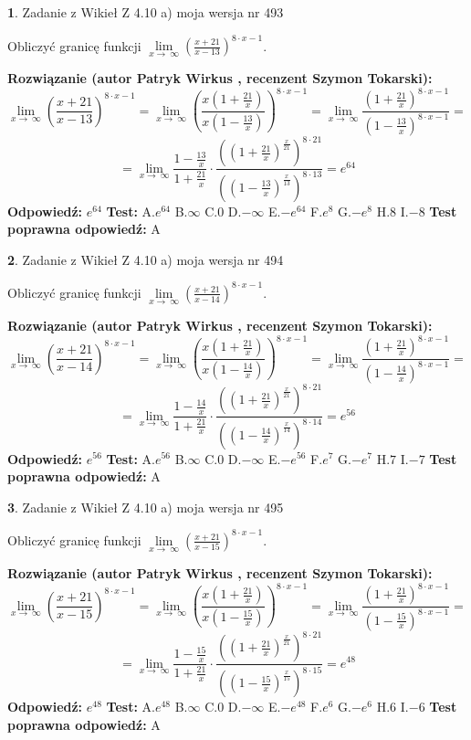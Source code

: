 \documentclass[12pt, a4paper]{article}
\theoremstyle{definition} %
\newtheorem{zad}{}
\newcommand{\zadStart}[1]{\begin{zad}#1\newline}
\newcommand{\zadStop}{\end{zad}}
\newcommand{\rozwStart}[2]{\noindent \textbf{Rozwiązanie (autor #1 , recenzent #2): }\newline}
\newcommand{\rozwStop}{\newline}
\newcommand{\odpStart}{\noindent \textbf{Odpowiedź:}\newline}
\newcommand{\odpStop}{\newline}
\newcommand{\testStart}{\noindent \textbf{Test:}\newline}
\newcommand{\testStop}{\newline}
\newcommand{\kluczStart}{\noindent \textbf{Test poprawna odpowiedź:}\newline}
\newcommand{\kluczStop}{\newline}
\begin{document}
\zadStart{Zadanie z Wikieł Z 4.10 a) moja wersja nr 493}

Obliczyć granicę funkcji  $\lim\limits_{x\to\ \infty}(\frac{x+21}{x-13})^{8\cdot x-1}$.
\zadStop
\rozwStart{Patryk Wirkus}{Szymon Tokarski}
$$\lim\limits_{x\to\ \infty}(\frac{x+21}{x-13})^{8\cdot x-1} = \lim\limits_{x\to\ \infty}(\frac{x(1+\frac{21}{x})}{x(1-\frac{13}{x})})^{8\cdot x-1}=\lim\limits_{x\to\ \infty}\frac{(1+\frac{21}{x})^{8\cdot x-1}}{(1-\frac{13}{x})^{8\cdot x-1}}=$$
$$=\lim\limits_{x\to\ \infty}\frac{1-\frac{13}{x}}{1+\frac{21}{x}}\cdot\frac{((1+\frac{21}{x})^{\frac{x}{21}})^{8\cdot21}}{((1-\frac{13}{x})^{\frac{x}{13}})^{8\cdot13}}=e^{64}$$
\rozwStop
\odpStart
$e^{64}$
\odpStop
\testStart
A.$e^{64}$ B.$\infty$ C.$0$ D.$-\infty$ E.$-e^{64}$
F.$e^{8}$ G.$-e^{8}$
H.$8$
I.$-8$
\testStop
\kluczStart
A
\kluczStop



\zadStart{Zadanie z Wikieł Z 4.10 a) moja wersja nr 494}

Obliczyć granicę funkcji  $\lim\limits_{x\to\ \infty}(\frac{x+21}{x-14})^{8\cdot x-1}$.
\zadStop
\rozwStart{Patryk Wirkus}{Szymon Tokarski}
$$\lim\limits_{x\to\ \infty}(\frac{x+21}{x-14})^{8\cdot x-1} = \lim\limits_{x\to\ \infty}(\frac{x(1+\frac{21}{x})}{x(1-\frac{14}{x})})^{8\cdot x-1}=\lim\limits_{x\to\ \infty}\frac{(1+\frac{21}{x})^{8\cdot x-1}}{(1-\frac{14}{x})^{8\cdot x-1}}=$$
$$=\lim\limits_{x\to\ \infty}\frac{1-\frac{14}{x}}{1+\frac{21}{x}}\cdot\frac{((1+\frac{21}{x})^{\frac{x}{21}})^{8\cdot21}}{((1-\frac{14}{x})^{\frac{x}{14}})^{8\cdot14}}=e^{56}$$
\rozwStop
\odpStart
$e^{56}$
\odpStop
\testStart
A.$e^{56}$ B.$\infty$ C.$0$ D.$-\infty$ E.$-e^{56}$
F.$e^{7}$ G.$-e^{7}$
H.$7$
I.$-7$
\testStop
\kluczStart
A
\kluczStop



\zadStart{Zadanie z Wikieł Z 4.10 a) moja wersja nr 495}

Obliczyć granicę funkcji  $\lim\limits_{x\to\ \infty}(\frac{x+21}{x-15})^{8\cdot x-1}$.
\zadStop
\rozwStart{Patryk Wirkus}{Szymon Tokarski}
$$\lim\limits_{x\to\ \infty}(\frac{x+21}{x-15})^{8\cdot x-1} = \lim\limits_{x\to\ \infty}(\frac{x(1+\frac{21}{x})}{x(1-\frac{15}{x})})^{8\cdot x-1}=\lim\limits_{x\to\ \infty}\frac{(1+\frac{21}{x})^{8\cdot x-1}}{(1-\frac{15}{x})^{8\cdot x-1}}=$$
$$=\lim\limits_{x\to\ \infty}\frac{1-\frac{15}{x}}{1+\frac{21}{x}}\cdot\frac{((1+\frac{21}{x})^{\frac{x}{21}})^{8\cdot21}}{((1-\frac{15}{x})^{\frac{x}{15}})^{8\cdot15}}=e^{48}$$
\rozwStop
\odpStart
$e^{48}$
\odpStop
\testStart
A.$e^{48}$ B.$\infty$ C.$0$ D.$-\infty$ E.$-e^{48}$
F.$e^{6}$ G.$-e^{6}$
H.$6$
I.$-6$
\testStop
\kluczStart
A
\kluczStop
\end{document}
